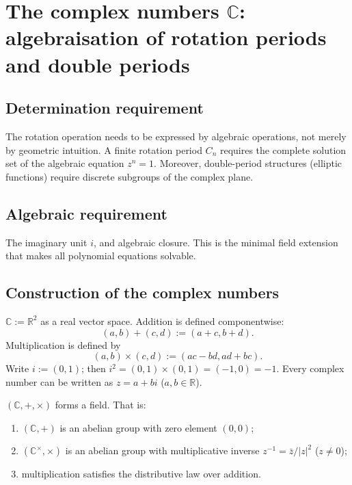 \section{\texorpdfstring{The complex numbers $\mathbb{C}$: algebraisation of rotation periods and double periods}{The complex numbers C: algebraisation of rotation periods and double periods}}

\subsection{\texorpdfstring{Determination requirement}{Determination requirement}}

The rotation operation needs to be expressed by algebraic operations, not merely by geometric intuition. A finite rotation period $C_n$ requires the complete solution set of the algebraic equation $z^n = 1$. Moreover, double-period structures (elliptic functions) require discrete subgroups of the complex plane.

\subsection{\texorpdfstring{Algebraic requirement}{Algebraic requirement}}

The imaginary unit $i$, and algebraic closure. This is the minimal field extension that makes all polynomial equations solvable.

\subsection{\texorpdfstring{Construction of the complex numbers}{Construction of the complex numbers}}

\begin{definition}\label{def:complex_construction}
$\mathbb{C} := \mathbb{R}^2$ as a real vector space. Addition is defined componentwise:
\[
(a,b) + (c,d) := (a+c, b+d).
\]
Multiplication is defined by
\[
(a,b) \times (c,d) := (ac - bd, ad + bc).
\]
Write $i := (0,1)$; then $i^2 = (0,1) \times (0,1) = (-1,0) = -1$. Every complex number can be written as $z = a + bi$ ($a,b \in \mathbb{R}$).
\end{definition}

\begin{proposition}\label{prop:complex_algebraically_closed}
$(\mathbb{C},+,\times)$ forms a field. That is:
\begin{enumerate}[label=(\roman*)]
    \item $(\mathbb{C},+)$ is an abelian group with zero element $(0,0)$;
    \item $(\mathbb{C}^{\times}, \times)$ is an abelian group with multiplicative inverse $z^{-1} = \bar{z}/|z|^2$ ($z \neq 0$);
    \item multiplication satisfies the distributive law over addition.
\end{enumerate}
\end{proposition}


